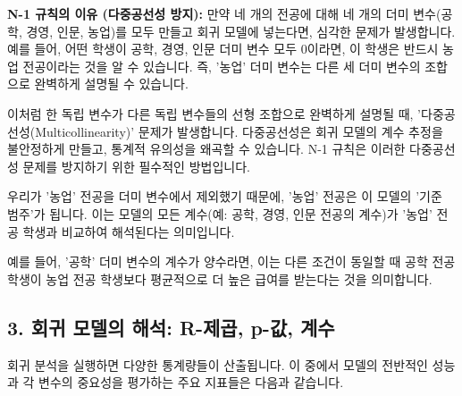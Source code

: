 \documentclass[11pt,a4paper]{book}
\theoremstyle{definition}
\begin{document}
\textbf{N-1 규칙의 이유 (다중공선성 방지):}
만약 네 개의 전공에 대해 네 개의 더미 변수(공학, 경영, 인문, 농업)를 모두 만들고 회귀 모델에 넣는다면, 심각한 문제가 발생합니다. 예를 들어, 어떤 학생이 공학, 경영, 인문 더미 변수 모두 0이라면, 이 학생은 반드시 농업 전공이라는 것을 알 수 있습니다. 즉, '농업' 더미 변수는 다른 세 더미 변수의 조합으로 완벽하게 설명될 수 있습니다.

이처럼 한 독립 변수가 다른 독립 변수들의 선형 조합으로 완벽하게 설명될 때, '다중공선성(Multicollinearity)' 문제가 발생합니다. 다중공선성은 회귀 모델의 계수 추정을 불안정하게 만들고, 통계적 유의성을 왜곡할 수 있습니다. N-1 규칙은 이러한 다중공선성 문제를 방지하기 위한 필수적인 방법입니다.

\begin{tcolorbox}[example={기준 범주의 역할}]
우리가 '농업' 전공을 더미 변수에서 제외했기 때문에, '농업' 전공은 이 모델의 '기준 범주'가 됩니다. 이는 모델의 모든 계수(예: 공학, 경영, 인문 전공의 계수)가 '농업' 전공 학생과 비교하여 해석된다는 의미입니다.

예를 들어, '공학' 더미 변수의 계수가 양수라면, 이는 다른 조건이 동일할 때 공학 전공 학생이 농업 전공 학생보다 평균적으로 더 높은 급여를 받는다는 것을 의미합니다.
\end{tcolorbox}

\subsection{3. 회귀 모델의 해석: R-제곱, p-값, 계수}

회귀 분석을 실행하면 다양한 통계량들이 산출됩니다. 이 중에서 모델의 전반적인 성능과 각 변수의 중요성을 평가하는 주요 지표들은 다음과 같습니다.
\end{document}
